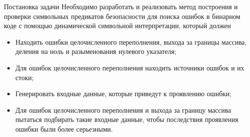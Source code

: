 \documentclass[10pt]{beamer}
\begin{document}
%

\begin{frame}{Постановка задачи}
Необходимо разработать и реализовать метод построения и проверки символьных
предикатов безопасности для поиска ошибок в бинарном коде с помощью динамической
символьной интерпретации, который должен
\begin{itemize}
    \item Находить ошибки целочисленного переполнения, выхода за границы
        массива, деления на ноль и разыменования нулевого указателя;
    \item Для ошибок целочисленного переполнения находить источники ошибок и их
        стоки;
    \item Генерировать входные данные, которые приведут к проявлению ошибки;
    \item Для ошибок целочисленного переполнения и выхода за границу массива
        пытаться подбирать такие входные данные, чтобы последствия проявления
        ошибки были более серьезными.
\end{itemize}
\end{frame}
\end{document}
